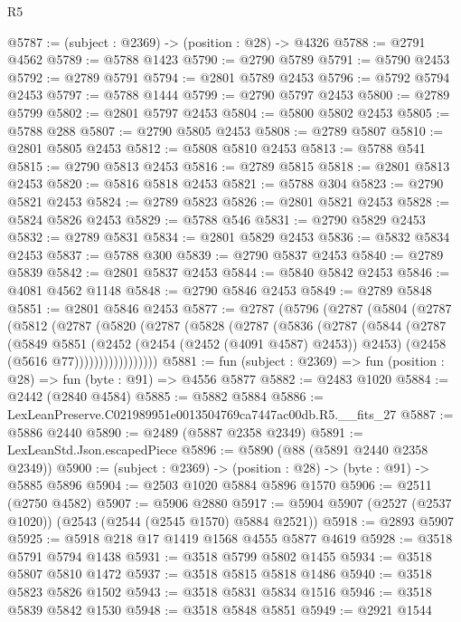 \begin{lexlean}{R5}
\begin{coremodule}
@5787 := (subject : @2369) -> (position : @28) -> @4326
@5788 := @2791 @4562
@5789 := @5788 @1423
@5790 := @2790 @5789
@5791 := @5790 @2453
@5792 := @2789 @5791
@5794 := @2801 @5789 @2453
@5796 := @5792 @5794 @2453
@5797 := @5788 @1444
@5799 := @2790 @5797 @2453
@5800 := @2789 @5799
@5802 := @2801 @5797 @2453
@5804 := @5800 @5802 @2453
@5805 := @5788 @288
@5807 := @2790 @5805 @2453
@5808 := @2789 @5807
@5810 := @2801 @5805 @2453
@5812 := @5808 @5810 @2453
@5813 := @5788 @541
@5815 := @2790 @5813 @2453
@5816 := @2789 @5815
@5818 := @2801 @5813 @2453
@5820 := @5816 @5818 @2453
@5821 := @5788 @304
@5823 := @2790 @5821 @2453
@5824 := @2789 @5823
@5826 := @2801 @5821 @2453
@5828 := @5824 @5826 @2453
@5829 := @5788 @546
@5831 := @2790 @5829 @2453
@5832 := @2789 @5831
@5834 := @2801 @5829 @2453
@5836 := @5832 @5834 @2453
@5837 := @5788 @300
@5839 := @2790 @5837 @2453
@5840 := @2789 @5839
@5842 := @2801 @5837 @2453
@5844 := @5840 @5842 @2453
@5846 := @4081 @4562 @1148
@5848 := @2790 @5846 @2453
@5849 := @2789 @5848
@5851 := @2801 @5846 @2453
@5877 := @2787
    (@5796
      (@2787
        (@5804
          (@2787
            (@5812
              (@2787
                (@5820
                  (@2787
                    (@5828
                      (@2787
                        (@5836
                          (@2787
                            (@5844
                              (@2787
                                (@5849
                                  @5851
                                  (@2452 (@2454 (@2452 (@4091 @4587) @2453)) @2453)
                                  (@2458 (@5616 @77)))))))))))))))))
@5881 := fun (subject : @2369) => fun (position : @28) => fun (byte : @91) => @4556 @5877
@5882 := @2483 @1020
@5884 := @2442 (@2840 @4584)
@5885 := @5882 @5884
@5886 := LexLeanPreserve.C021989951e0013504769ca7447ac00db.R5.__fits_27
@5887 := @5886 @2440
@5890 := @2489 (@5887 @2358 @2349)
@5891 := LexLeanStd.Json.escapedPiece
@5896 := @5890 (@88 (@5891 @2440 @2358 @2349))
@5900 := (subject : @2369) -> (position : @28) -> (byte : @91) -> @5885 @5896
@5904 := @2503 @1020 @5884 @5896 @1570
@5906 := @2511 (@2750 @4582)
@5907 := @5906 @2880
@5917 := @5904 @5907 (@2527 (@2537 @1020)) (@2543 (@2544 (@2545 @1570) @5884 @2521))
@5918 := @2893 @5907
@5925 := @5918 @218 @17 @1419 @1568 @4555 @5877 @4619
@5928 := @3518 @5791 @5794 @1438
@5931 := @3518 @5799 @5802 @1455
@5934 := @3518 @5807 @5810 @1472
@5937 := @3518 @5815 @5818 @1486
@5940 := @3518 @5823 @5826 @1502
@5943 := @3518 @5831 @5834 @1516
@5946 := @3518 @5839 @5842 @1530
@5948 := @3518 @5848 @5851
@5949 := @2921 @1544

\end{coremodule}
\end{lexlean}
